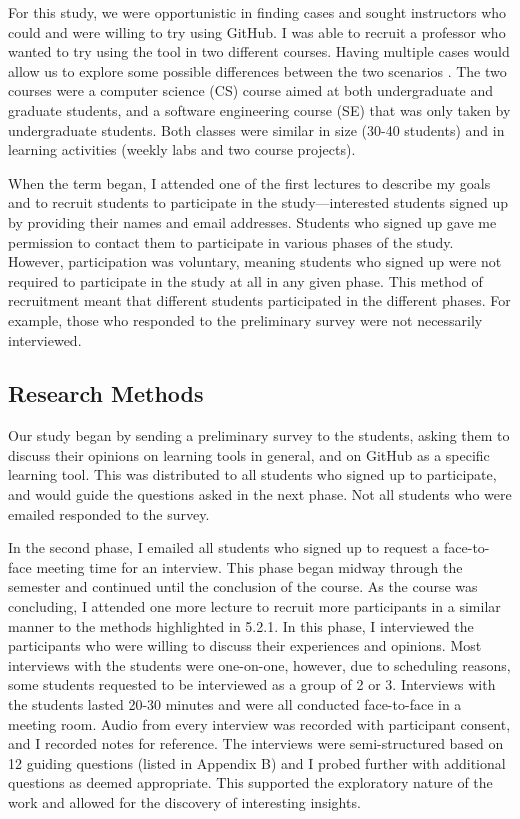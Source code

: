 For this study, we were opportunistic in finding cases and sought instructors who could and were willing to try using GitHub. I was able to recruit a professor who wanted to try using the tool in two different courses. Having multiple cases would allow us to explore some possible differences between the two scenarios \cite{yin2013case}. The two courses were a computer science (CS) course aimed at both undergraduate and graduate students, and a software engineering course (SE) that was only taken by undergraduate students. Both classes were similar in size (30-40 students) and in learning activities (weekly labs and two course projects).

When the term began, I attended one of the first lectures to describe my goals and to recruit students to participate in the study---interested students signed up by providing their names and email addresses. Students who signed up gave me permission to contact them to participate in various phases of the study. However, participation was voluntary, meaning students who signed up were not required to participate in the study at all in any given phase. This method of recruitment meant that different students participated in the different phases. For example, those who responded to the preliminary survey were not necessarily interviewed.

\subsection{Research Methods}
Our study began by sending a preliminary survey to the students, asking them to discuss their opinions on learning tools in general, and on GitHub as a specific learning tool. This was distributed to all students who signed up to participate, and would guide the questions asked in the next phase. Not all students who were emailed responded to the survey.

In the second phase, I emailed all students who signed up to request a face-to-face meeting time for an interview. This phase began midway through the semester and continued until the conclusion of the course. As the course was concluding, I attended one more lecture to recruit more participants in a similar manner to the methods highlighted in 5.2.1. In this phase, I interviewed the participants who were willing to discuss their experiences and opinions. Most interviews with the students were one-on-one, however, due to scheduling reasons, some students requested to be interviewed as a group of 2 or 3. Interviews with the students lasted 20-30 minutes and were all conducted face-to-face in a meeting room. Audio from every interview was recorded with participant consent, and I recorded notes for reference. The interviews were semi-structured based on 12 guiding questions (listed in Appendix B) and I probed further with additional questions as deemed appropriate. This supported the exploratory nature of the work and allowed for the discovery of interesting insights.

